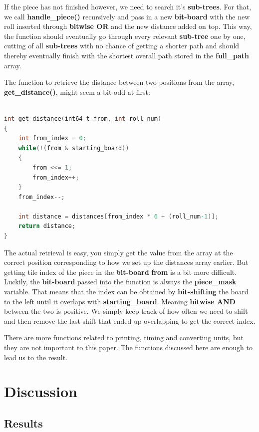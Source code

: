 \documentclass[12pt]{article}
\begin{document}
If the piece has not finished however, we need to search it's \textbf{sub-trees}. For that, we call \textbf{handle\_piece()} recursively and pass in a new \textbf{bit-board} with the new roll inserted through \textbf{bitwise OR} and the new distance added on top.
This way, the function should eventually go through every relevant \textbf{sub-tree} one by one, cutting of all \textbf{sub-trees} with no chance of getting a shorter path and should thereby eventually finish with the shortest overall path stored in the \textbf{full\_path} array.


The function to retrieve the distance between two positions from the array, \textbf{get\_distance()}, might seem a bit odd at first:

\begin{lstlisting}[language=C, caption={Get distance}, label={lst:get-distance}]

int get_distance(int64_t from, int roll_num)
{
    int from_index = 0;
    while(!(from & starting_board))
    {
        from <<= 1;
        from_index++;
    }
    from_index--;

    int distance = distances[from_index * 6 + (roll_num-1)];
    return distance;
}
\end{lstlisting}

The actual retrieval is easy, you simply get the value from the array at the correct position corresponding to how we set up the distances array earlier. But getting tile index of the piece in the \textbf{bit-board} \textbf{from} is a bit more difficult. Luckily, the \textbf{bit-board} passed into the function is always the \textbf{piece\_mask} variable. That means that the index can be obtained by \textbf{bit-shifting} the board to the left until it overlaps with \textbf{starting\_board}. Meaning \textbf{bitwise AND} between the two is positive. We simply keep track of how often we need to shift and then remove the last shift that ended up overlapping to get the correct index.

There are more functions related to printing, timing and converting units, but they are not important to this paper. The functions discussed here are enough to lead us to the result.

\section{Discussion}

\subsection{Results}
\end{document}
